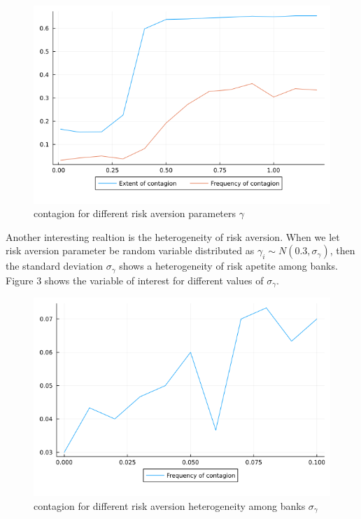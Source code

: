 \documentclass{article}
\begin{document}
\begin{figure}[ht]
  \centering
  \includegraphics[scale=0.45]{contagionplot_optim.png}
  \caption{contagion for different risk aversion parameters $\gamma$}
\end{figure}

Another interesting realtion is the heterogeneity of risk aversion. When we let risk aversion parameter be random variable distributed as $\gamma_i \sim N(0.3, \sigma_{\gamma})$, then the standard deviation $\sigma_{\gamma}$ shows a heterogeneity of risk apetite among banks. Figure 3 shows the variable of interest for different values of $\sigma_{\gamma}$. 

\begin{figure}[h]
  \centering
  \includegraphics[scale=0.45]{contagion_freq1.png}
  \caption{contagion for different risk aversion heterogeneity among banks $\sigma_{\gamma}$}
\end{figure}
\end{document}

